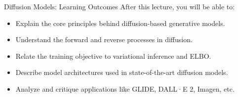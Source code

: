 \begin{frame}{Diffusion Models: Learning Outcomes}
    After this lecture, you will be able to:
    \begin{itemize}
        \item Explain the core principles behind diffusion-based generative models.
        \item Understand the forward and reverse processes in diffusion.
        \item Relate the training objective to variational inference and ELBO.
        \item Describe model architectures used in state-of-the-art diffusion models.
        \item Analyze and critique applications like GLIDE, DALL·E 2, Imagen, etc.
    \end{itemize}
\end{frame}
